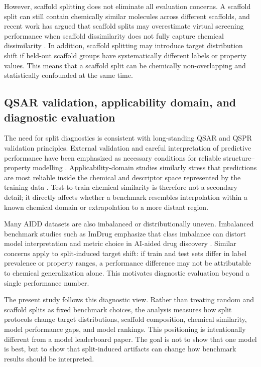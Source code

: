 However, scaffold splitting does not eliminate all evaluation concerns. A scaffold split can still contain chemically similar molecules across different scaffolds, and recent work has argued that scaffold splits may overestimate virtual screening performance when scaffold dissimilarity does not fully capture chemical dissimilarity \citep{guo2024scaffold}. In addition, scaffold splitting may introduce target distribution shift if held-out scaffold groups have systematically different labels or property values. This means that a scaffold split can be chemically non-overlapping and statistically confounded at the same time.

\subsection{QSAR validation, applicability domain, and diagnostic evaluation}

The need for split diagnostics is consistent with long-standing QSAR and QSPR validation principles. External validation and careful interpretation of predictive performance have been emphasized as necessary conditions for reliable structure--property modelling \citep{tropsha2003earnest,gramatica2007principles}. Applicability-domain studies similarly stress that predictions are most reliable inside the chemical and descriptor space represented by the training data \citep{netzeva2005applicability,sahigara2012applicability}. Test-to-train chemical similarity is therefore not a secondary detail; it directly affects whether a benchmark resembles interpolation within a known chemical domain or extrapolation to a more distant region.

Many AIDD datasets are also imbalanced or distributionally uneven. Imbalanced benchmark studies such as ImDrug emphasize that class imbalance can distort model interpretation and metric choice in AI-aided drug discovery \citep{li2022imdrug}. Similar concerns apply to split-induced target shift: if train and test sets differ in label prevalence or property ranges, a performance difference may not be attributable to chemical generalization alone. This motivates diagnostic evaluation beyond a single performance number.

The present study follows this diagnostic view. Rather than treating random and scaffold splits as fixed benchmark choices, the analysis measures how split protocols change target distributions, scaffold composition, chemical similarity, model performance gaps, and model rankings. This positioning is intentionally different from a model leaderboard paper. The goal is not to show that one model is best, but to show that split-induced artifacts can change how benchmark results should be interpreted.
